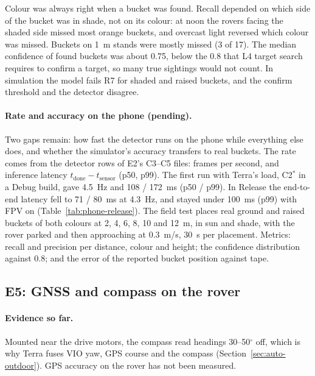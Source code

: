 Colour was always right when a bucket was found.
Recall depended on which side of the bucket was in shade, not on its colour: at noon the rovers facing the shaded side missed most orange buckets, and overcast light reversed which colour was missed.
Buckets on 1~m stands were mostly missed (3 of 17).
The median confidence of found buckets was about 0.75, below the 0.8 that L4 target search requires to confirm a target, so many true sightings would not count.
In simulation the model fails R7 for shaded and raised buckets, and the confirm threshold and the detector disagree.

\paragraph{Rate and accuracy on the phone (pending).}
Two gaps remain: how fast the detector runs on the phone while everything else does, and whether the simulator's accuracy transfers to real buckets.
The rate comes from the detector rows of E2's C3--C5 files: frames per second, and inference latency $t_{\text{done}} - t_{\text{sensor}}$ (p50, p99).
The first run with Terra's load, C2$^{*}$ in a Debug build, gave 4.5~Hz and 108 / 172~ms (p50 / p99). In Release the end-to-end latency fell to 71 / 80~ms at 4.3~Hz, and stayed under 100~ms (p99) with FPV on (Table~\ref{tab:phone-release}).
The field test places real ground and raised buckets of both colours at 2, 4, 6, 8, 10 and 12~m, in sun and shade, with the rover parked and then approaching at 0.3~m/s, 30~s per placement.
Metrics: recall and precision per distance, colour and height; the confidence distribution against 0.8; and the error of the reported bucket position against tape.

\subsection{E5: GNSS and compass on the rover}
\label{sec:phone-e5}

\paragraph{Evidence so far.}
Mounted near the drive motors, the compass read headings 30--50$^\circ$ off, which is why Terra fuses VIO yaw, GPS course and the compass (Section~\ref{sec:auto-outdoor}).
GPS accuracy on the rover has not been measured.

